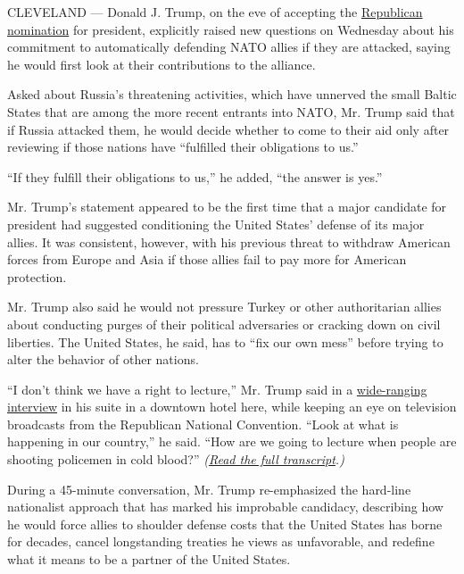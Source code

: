 CLEVELAND --- Donald J. Trump, on the eve of accepting the
\href{http://www.nytimes.com/2016/07/21/us/politics/republican-national-convention.html}{Republican
nomination} for president, explicitly raised new questions on Wednesday
about his commitment to automatically defending NATO allies if they are
attacked, saying he would first look at their contributions to the
alliance.

Asked about Russia's threatening activities, which have unnerved the
small Baltic States that are among the more recent entrants into NATO,
Mr. Trump said that if Russia attacked them, he would decide whether to
come to their aid only after reviewing if those nations have ``fulfilled
their obligations to us.''

``If they fulfill their obligations to us,'' he added, ``the answer is
yes.''

Mr. Trump's statement appeared to be the first time that a major
candidate for president had suggested conditioning the United States'
defense of its major allies. It was consistent, however, with his
previous threat to withdraw American forces from Europe and Asia if
those allies fail to pay more for American protection.

Mr. Trump also said he would not pressure Turkey or other authoritarian
allies about conducting purges of their political adversaries or
cracking down on civil liberties. The United States, he said, has to
``fix our own mess'' before trying to alter the behavior of other
nations.

``I don't think we have a right to lecture,'' Mr. Trump said in a
\href{http://www.nytimes.com/2016/07/22/us/politics/donald-trump-foreign-policy-interview.html}{wide-ranging
interview} in his suite in a downtown hotel here, while keeping an eye
on television broadcasts from the Republican National Convention. ``Look
at what is happening in our country,'' he said. ``How are we going to
lecture when people are shooting policemen in cold blood?''
\emph{(}\href{http://www.nytimes.com/2016/07/22/us/politics/donald-trump-foreign-policy-interview.html}{\emph{Read
the full transcript}}\emph{.)}

During a 45-minute conversation, Mr. Trump re-emphasized the hard-line
nationalist approach that has marked his improbable candidacy,
describing how he would force allies to shoulder defense costs that the
United States has borne for decades, cancel longstanding treaties he
views as unfavorable, and redefine what it means to be a partner of the
United States.

